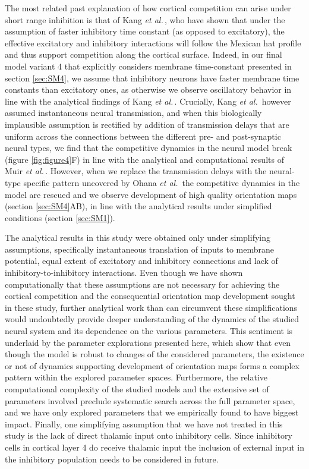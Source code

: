 \documentclass[utf8]{frontiersSCNS}
\newcommand{\etal}{\textit{et al.}}
\begin{document}
The most related past explanation of how cortical competition can arise under short range inhibition is that of Kang \etal\,\citep{Kang2003}, who have shown 
that under the assumption of faster inhibitory time constant (as opposed to excitatory), the effective excitatory and inhibitory interactions will follow the 
Mexican hat profile and thus support competition along the cortical surface. Indeed, in our final model variant 4 that explicitly considers membrane time-constant presented in section \ref{sec:SM4}, 
we assume that inhibitory neurons have faster membrane time constants than excitatory ones, as otherwise we observe oscillatory behavior in line with the analytical findings of Kang \etal\,\citep{Kang2003}. 
Crucially, Kang \etal\,\citep{Kang2003} however assumed instantaneous neural transmission, and when this biologically implausible assumption is rectified by addition of transmission delays that are uniform 
across the connections between the different pre- and post-synaptic neural types, we find that the competitive dynamics in the neural model break (figure \ref{fig:figure4}F) in line with the analytical and 
computational results of Muir \etal\,\citep{Muir2014}. However, when we replace the transmission delays with the neural-type specific  pattern uncovered by Ohana \etal\,\citep{Ohana2012} the competitive dynamics 
in the model are rescued and we observe development of high quality orientation maps (section \ref{sec:SM4}AB), in line with the analytical results under simplified conditions (section \ref{sec:SM1}).

The analytical results in this study were obtained only under simplifying assumptions, specifically instantaneous translation of inputs to membrane potential, equal extent of 
excitatory and inhibitory connections and lack of inhibitory-to-inhibitory interactions. Even though we have shown computationally that these assumptions are not necessary 
for achieving the cortical competition and the consequential orientation map development sought in these study, further analytical work than can circumvent these simplifications would 
undoubtedly provide deeper understanding of the dynamics of the studied neural system and its dependence on the various parameters. This sentiment is underlaid by the parameter 
explorations presented here, which show that even though the model is robust to changes of the considered parameters, the existence or not of dynamics supporting development of 
orientation maps forms a complex pattern within the explored parameter spaces. Furthermore, the relative computational complexity of the studied models and the extensive set of parameters
involved preclude systematic search across the full parameter space, and we have only explored parameters that we empirically found to have biggest impact. Finally, one simplifying assumption 
that we have not treated in this study is the lack of direct thalamic input onto inhibitory cells. Since inhibitory cells in cortical layer 4 do receive thalamic input \citep{Binzegger2004} the 
inclusion of external input in the inhibitory population needs to be considered in future.
\end{document}
